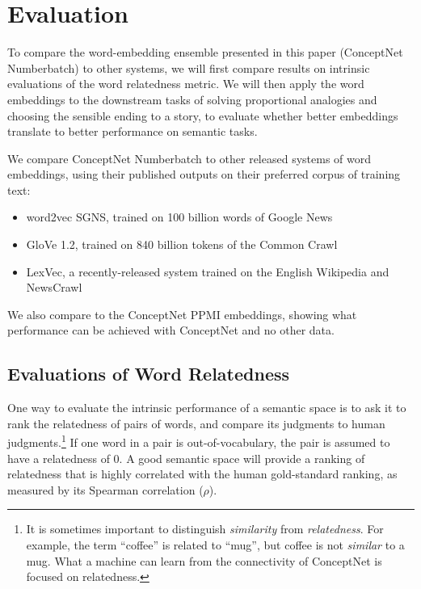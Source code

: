 \documentclass[letterpaper]{article}
\begin{document}
\section{Evaluation}

To compare the word-embedding ensemble presented in this paper (ConceptNet
Numberbatch) to other systems, we will first compare results on intrinsic
evaluations of the word relatedness metric. We will then apply the word
embeddings to the downstream tasks of solving proportional analogies and
choosing the sensible ending to a story, to evaluate whether better embeddings
translate to better performance on semantic tasks.

We compare ConceptNet Numberbatch to other released systems of word embeddings,
using their published outputs on their preferred corpus of training text:

\begin{itemize}
    \item word2vec SGNS, trained on 100 billion words of Google News \cite{mikolov2013word2vec}
    \item GloVe 1.2, trained on 840 billion tokens of the Common Crawl \cite{pennington2014glove}
    \item LexVec, a recently-released system trained on the English Wikipedia and NewsCrawl \cite{salle2016lexvec}
\end{itemize}

We also compare to the ConceptNet PPMI embeddings, showing what performance
can be achieved with ConceptNet and no other data.

\subsection{Evaluations of Word Relatedness}
\label{intrinsic-evaluations}

One way to evaluate the intrinsic performance of a semantic space is to ask it
to rank the relatedness of pairs of words, and compare its judgments to human
judgments.\footnote{It is sometimes important to distinguish \emph{similarity}
from \emph{relatedness}. For example, the term ``coffee'' is related to
``mug'', but coffee is not \emph{similar} to a mug. What a machine can learn
from the connectivity of ConceptNet is focused on relatedness.} If one word in
a pair is out-of-vocabulary, the pair is assumed to have a relatedness of 0. A
good semantic space will provide a ranking of relatedness that is highly
correlated with the human gold-standard ranking, as measured by its Spearman
correlation ($\rho$).
\end{document}
